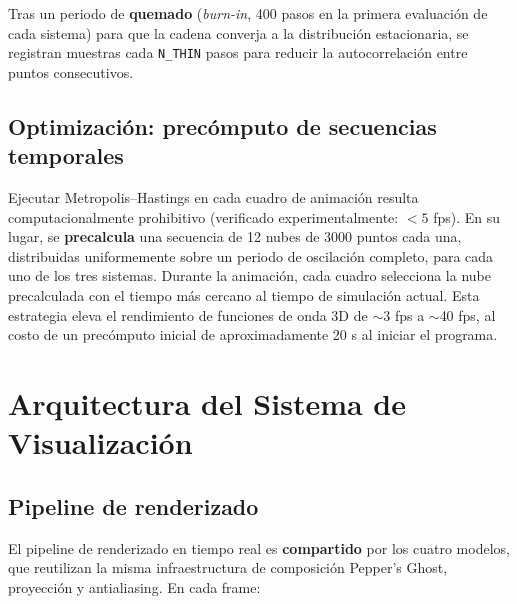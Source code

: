 \documentclass[12pt, a4paper]{article}
\begin{document}
Tras un periodo de \textbf{quemado} (\textit{burn-in}, 400 pasos en la
primera evaluación de cada sistema) para que la cadena converja a la
distribución estacionaria, se registran muestras cada \texttt{N\_THIN}
pasos para reducir la autocorrelación entre puntos consecutivos.

\subsection{Optimización: precómputo de secuencias temporales}

Ejecutar Metropolis--Hastings en cada cuadro de animación resulta
computacionalmente prohibitivo (verificado experimentalmente: $<5$
fps). En su lugar, se \textbf{precalcula} una secuencia de 12 nubes de
3000 puntos cada una, distribuidas uniformemente sobre un periodo de
oscilación completo, para cada uno de los tres sistemas. Durante la
animación, cada cuadro selecciona la nube precalculada con el tiempo
más cercano al tiempo de simulación actual. Esta estrategia eleva el
rendimiento de funciones de onda 3D de $\sim$3 fps a $\sim$40 fps,
al costo de un precómputo inicial de aproximadamente 20 s al iniciar
el programa.

\section{Arquitectura del Sistema de Visualización}

\subsection{Pipeline de renderizado}

El pipeline de renderizado en tiempo real es \textbf{compartido} por
los cuatro modelos, que reutilizan la misma infraestructura de
composición Pepper's Ghost, proyección y antialiasing. En cada frame:
\end{document}

